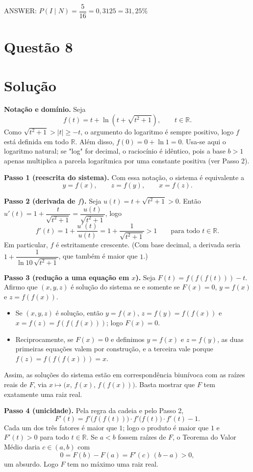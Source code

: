 \documentclass{article}%
\begin{document}
\noindent ANSWER: $P(I\mid N)=\dfrac{5}{16}=0{,}3125=31{,}25\%$%
\newpage%
\section*{Questão 8}

\section*{Solução}

\textbf{Notação e domínio.} Seja
\[
f(t)=t+\ln\left(t+\sqrt{t^2+1}\right), \qquad t\in\mathbb{R}.
\]
Como $\sqrt{t^2+1}>|t|\geq -t$, o argumento do logaritmo é sempre positivo, logo $f$ está definida em todo $\mathbb{R}$. Além disso, $f(0)=0+\ln 1=0$. Usa-se aqui o logaritmo natural; se "log" for decimal, o raciocínio é idêntico, pois a base $b>1$ apenas multiplica a parcela logarítmica por uma constante positiva (ver Passo 2).

\textbf{Passo 1 (reescrita do sistema).} Com essa notação, o sistema é equivalente a
\[
y=f(x), \qquad z=f(y), \qquad x=f(z).
\]

\textbf{Passo 2 (derivada de $f$).} Seja $u(t)=t+\sqrt{t^2+1}>0$. Então $u'(t)=1+\dfrac{t}{\sqrt{t^2+1}}=\dfrac{u(t)}{\sqrt{t^2+1}}$, logo
\[
f'(t)=1+\frac{u'(t)}{u(t)}=1+\frac{1}{\sqrt{t^2+1}}>1 \qquad \text{para todo } t\in\mathbb{R}.
\]
Em particular, $f$ é estritamente crescente. (Com base decimal, a derivada seria $1+\dfrac{1}{\ln 10\,\sqrt{t^2+1}}$, que também é maior que $1$.)

\textbf{Passo 3 (redução a uma equação em $x$).} Seja $F(t)=f(f(f(t)))-t$. Afirmo que $(x,y,z)$ é solução do sistema se e somente se $F(x)=0$, $y=f(x)$ e $z=f(f(x))$.
\begin{itemize}
\item[(i)] Se $(x,y,z)$ é solução, então $y=f(x)$, $z=f(y)=f(f(x))$ e $x=f(z)=f(f(f(x)))$; logo $F(x)=0$.
\item[(ii)] Reciprocamente, se $F(x)=0$ e definimos $y=f(x)$ e $z=f(y)$, as duas primeiras equações valem por construção, e a terceira vale porque $f(z)=f(f(f(x)))=x$.
\end{itemize}
Assim, as soluções do sistema estão em correspondência biunívoca com as raízes reais de $F$, via $x\mapsto\big(x,\,f(x),\,f(f(x))\big)$. Basta mostrar que $F$ tem exatamente uma raiz real.

\textbf{Passo 4 (unicidade).} Pela regra da cadeia e pelo Passo 2,
\[
F'(t)=f'\big(f(f(t))\big)\cdot f'\big(f(t)\big)\cdot f'(t)-1.
\]
Cada um dos três fatores é maior que $1$; logo o produto é maior que $1$ e $F'(t)>0$ para todo $t\in\mathbb{R}$. Se $a<b$ fossem raízes de $F$, o Teorema do Valor Médio daria $c\in(a,b)$ com
\[
0=F(b)-F(a)=F'(c)\,(b-a)>0,
\]
um absurdo. Logo $F$ tem no máximo uma raiz real.
\end{document}
